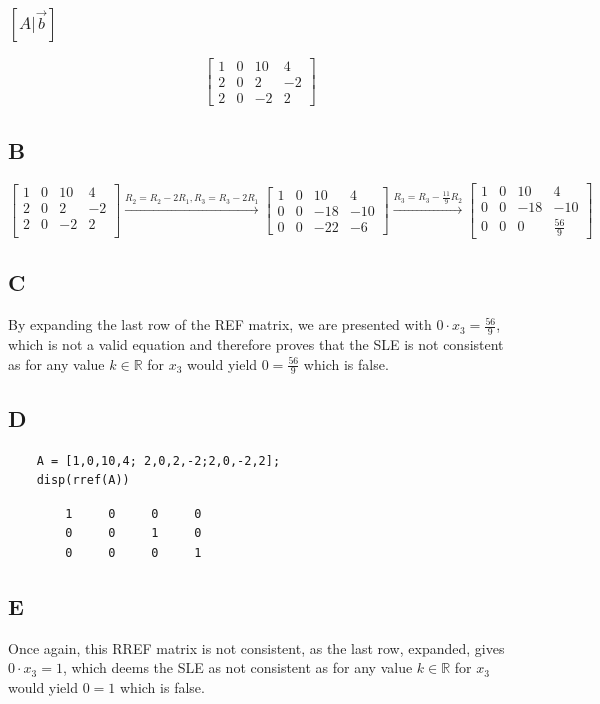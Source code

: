 \documentclass{article}
\begin{document}
\subsubsection*{$[A | \vec{b} ]$}

\[
	\begin{bmatrix}
		1 & 0 & 10 & 4 \\2&0&2&-2\\2&0&-2&2
	\end{bmatrix}
\]

\subsection*{B}

\[
	\begin{bmatrix}
		1 & 0 & 10 & 4  \\
		2 & 0 & 2  & -2 \\
		2 & 0 & -2 & 2  \\
	\end{bmatrix}
	\xrightarrow{R_2 = R_2 - 2R_1, R_3 = R_3 - 2R_1}
	\begin{bmatrix}
		1 & 0 & 10  & 4   \\
		0 & 0 & -18 & -10 \\
		0 & 0 & -22 & -6
	\end{bmatrix}
	\xrightarrow{R_3 = R_3 - \frac{11}{9}R_2}
	\begin{bmatrix}
		1 & 0 & 10  & 4            \\
		0 & 0 & -18 & -10          \\
		0 & 0 & 0   & \frac{56}{9}
	\end{bmatrix}
\]

\subsection*{C}

By expanding the last row of the REF matrix, we are presented with $0 \cdot x_3 = \frac{56}{9}$, which is not a valid equation and therefore proves that the SLE is not consistent as for any value $k \in \mathbb{R}$ for $x_3$ would yield $0 = \frac{56}{9}$ which is false.

\subsection*{D}


\begin{verbatim}
	A = [1,0,10,4; 2,0,2,-2;2,0,-2,2];
	disp(rref(A))
\end{verbatim}

\color{lightgray} 
\begin{verbatim}
		1     0     0     0
		0     0     1     0
		0     0     0     1
\end{verbatim} 
\color{black}

\subsection*{E}

Once again, this RREF matrix is not consistent, as the last row, expanded, gives $0 \cdot x_3 = 1$, which deems the SLE as not consistent as for any value $k \in \mathbb{R}$ for $x_3$ would yield $0 = 1$ which is false.
\end{document}
